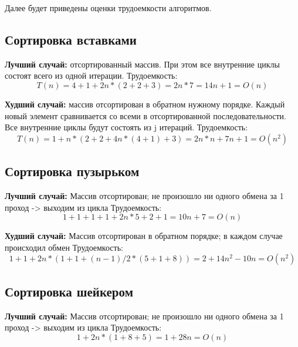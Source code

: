 \documentclass[12pt]{report}
\begin{document}
Далее будет приведены оценки трудоемкости алгоритмов.

\subsection{Сортировка вставками}

\textbf{Лучший случай:} отсортированный массив. При этом все внутренние циклы состоят всего из одной итерации.\newline
Трудоемкость: \begin{equation}T(n) = 4 + 1 + 2n * (2+2+3)  =  2n * 7 = 14n + 1 = O(n)\end{equation}

\textbf{Худший случай:} массив отсортирован в обратном нужному порядке. Каждый новый элемент сравнивается со всеми в отсортированной последовательности.
Все внутренние циклы будут состоять из j итераций. \newline
Трудоемкость: \begin{equation}T(n) = 1+n*(2+2+4n*(4+1)+3) = 2n*n+7n+1 =  O(n^2)\end{equation}

 \subsection{Сортировка пузырьком}
\textbf{Лучший случай:} Массив отсортирован; не произошло ни одного обмена за 1 проход -> выходим из цикла \newline
Трудоемкость:  \begin{equation}1+1+1+1+2n*5+2+1 = 10n + 7=  O(n)\end{equation}

\textbf{Худший случай:}  Массив отсортирован в обратном порядке; в каждом случае происходил обмен\newline
Трудоемкость: \begin{equation}1+1+2n*(1 + 1 + (n-1)/2*(5+1+8 ) ) = 2 + 14n^2 - 10n = O(n^2)\end{equation}

\subsection{Сортировка шейкером}
\textbf{Лучший случай:} Массив отсортирован; не произошло ни одного обмена за 1 проход -> выходим из цикла \newline
Трудоемкость:  \begin{equation}1+2n*(1 + 8 + 5) = 1+28n=  O(n)\end{equation}
\end{document}

